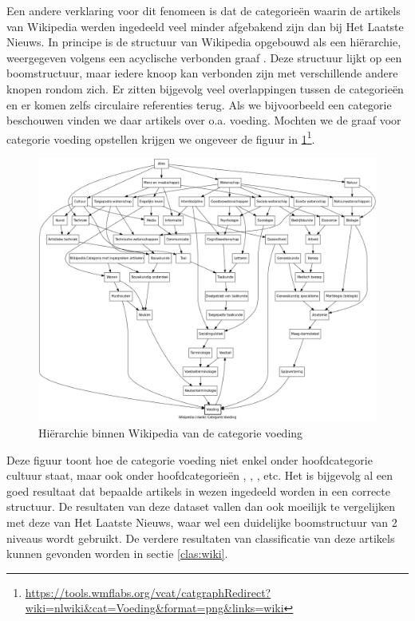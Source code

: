 Een andere verklaring voor dit fenomeen is dat de categorie\"en waarin de artikels van Wikipedia werden ingedeeld veel minder afgebakend zijn dan bij Het Laatste Nieuws. In principe is de structuur van Wikipedia opgebouwd als een hi\"erarchie, weergegeven volgens een acyclische verbonden graaf \cite{Milne2007}. Deze structuur lijkt op een boomstructuur, maar iedere knoop kan verbonden zijn met verschillende andere knopen rondom zich. Er zitten bijgevolg veel overlappingen tussen de categorie\"en en er komen zelfs circulaire referenties terug. Als we bijvoorbeeld een categorie  beschouwen vinden we daar artikels over o.a. voeding. Mochten we de graaf voor categorie voeding opstellen krijgen we ongeveer de figuur in \ref{fig:wiki-voeding}\footnote{\url{https://tools.wmflabs.org/vcat/catgraphRedirect?wiki=nlwiki&cat=Voeding&format=png&links=wiki}}.

\begin{figure}[h]
	\caption{Hi\"erarchie binnen Wikipedia van de categorie voeding\protect}
	\label{fig:wiki-voeding}	
	\includegraphics[width=\textwidth]{fig/voeding.png}
\end{figure}

Deze figuur toont hoe de categorie voeding niet enkel onder hoofdcategorie cultuur staat, maar ook onder hoofdcategorie\"en , , , etc. Het is bijgevolg al een goed resultaat dat bepaalde artikels in wezen ingedeeld worden in een correcte structuur. De resultaten van deze dataset vallen dan ook moeilijk te vergelijken met deze van Het Laatste Nieuws, waar wel een duidelijke boomstructuur van 2 niveaus wordt gebruikt. De verdere resultaten van classificatie van deze artikels kunnen gevonden worden in sectie \ref{clas:wiki}.

